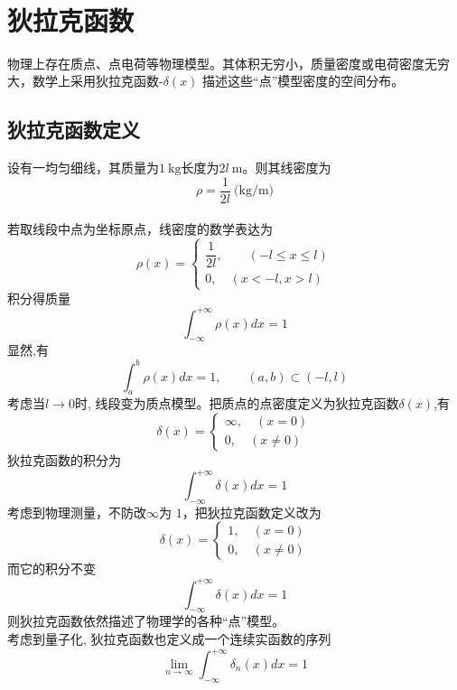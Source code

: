 ~~\\ 


\section{狄拉克函数}
物理上存在质点、点电荷等物理模型。其体积无穷小，质量密度或电荷密度无穷大，数学上采用狄拉克函数-$\delta(x) $ 描述这些“点”模型密度的空间分布。
\subsection{狄拉克函数定义}
设有一均匀细线，其质量为$1~\text{kg}$长度为$2l~\text{m}$。则其线密度为$$\rho=\frac{1}{2l}~\text{(kg/m)}$$\\
若取线段中点为坐标原点，线密度的数学表达为 
	  \[\rho(x)=\left\{\begin{array}{c}
		\dfrac{1}{2 l}, \qquad (-l \leq x \leq l) \\
		0, \quad (x<-l, x>l)
		\end{array}\right.\]
积分得质量
	 \[\int_{-\infty}^{+\infty} \rho(x) d x= 1\]
显然,有
	 \[\int_{a}^{b} \rho(x) d x =1, \qquad  (a,b) \subset(-l,l) \]
考虑当$l \to 0$时, 线段变为质点模型。把质点的点密度定义为狄拉克函数$\delta(x)$,有
	 \[\delta(x)=\left\{\begin{array}{c}
		 \infty, \quad(x=0) \\
		 0, \quad(x \neq 0)
		 \end{array}\right. \]
狄拉克函数的积分为
	 \[\int_{-\infty}^{+\infty} \delta(x) d x=1 \]
考虑到物理测量，不防改$\infty$为 $1$，把狄拉克函数定义改为
	 \[\delta(x)=\left\{\begin{array}{c}
		 1, \quad(x=0) \\
		 0, \quad(x \neq 0)
		 \end{array}\right. \]
而它的积分不变
	 \[\int_{-\infty}^{+\infty} \delta(x) d x=1 \] 
则狄拉克函数依然描述了物理学的各种“点”模型。\\
考虑到量子化, 狄拉克函数也定义成一个连续实函数的序列 
\[\lim_{n\to\infty} \int_{-\infty}^{+\infty} \delta_n (x) d x=1 \]

